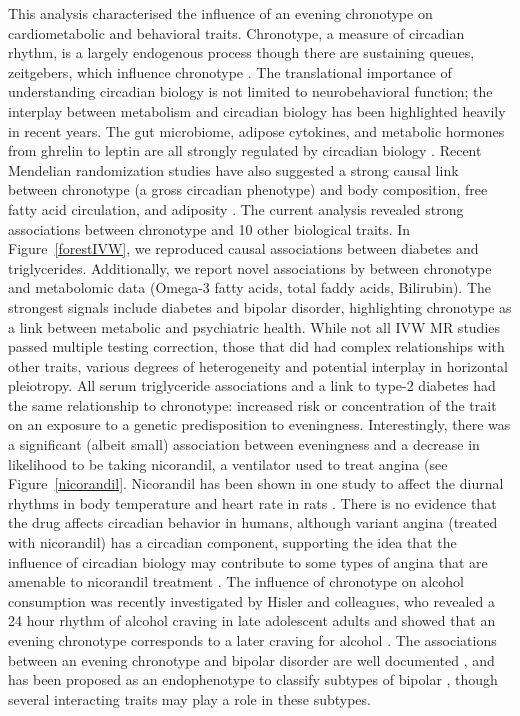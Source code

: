 \documentclass[journal,article,submit,moreauthors,pdftex]{Definitions/mdpi}
\begin{document}
This analysis characterised the influence of an evening chronotype on cardiometabolic and behavioral traits. Chronotype, a measure of circadian rhythm, is a largely endogenous process though there are sustaining queues, zeitgebers, which influence chronotype \cite{albrecht_timing_2012}. The translational importance of understanding circadian biology is not limited to neurobehavioral function; the interplay between metabolism and circadian biology has been highlighted heavily in recent years. The gut microbiome, adipose cytokines, and metabolic hormones from ghrelin to leptin are all strongly regulated by circadian biology \cite{li_circadian_2020,socaciu_melatonin_2020,pan_circadian_2020}. Recent Mendelian randomization studies have also suggested a strong causal link between chronotype (a gross circadian phenotype) and body composition, free fatty acid circulation, and adiposity \cite{adams_evaluating_2019,jones_genome-wide_2019}. The current analysis revealed strong associations between chronotype and 10 other biological traits. In Figure~\ref{forestIVW}, we reproduced causal associations between diabetes and triglycerides. Additionally, we report novel associations by between chronotype and metabolomic data (Omega-3 fatty acids, total faddy acids, Bilirubin). The strongest signals include diabetes and bipolar disorder, highlighting chronotype as a link between metabolic and psychiatric health. While not all IVW MR studies passed multiple testing correction, those that did had complex relationships with other traits, various degrees of heterogeneity and potential interplay in horizontal pleiotropy.
All serum triglyceride associations and a link to type-2 diabetes had the same relationship to chronotype: increased risk or concentration of the trait on an exposure to a genetic predisposition to eveningness. Interestingly, there was a significant (albeit small) association between eveningness and a decrease in likelihood to be taking nicorandil, a ventilator used to treat angina (see Figure~\ref{nicorandil}. Nicorandil has been shown in one study to affect the diurnal rhythms in body temperature and heart rate in rats \cite{Gantenbein}. There is no evidence that the drug affects circadian behavior in humans, although variant angina (treated with nicorandil) has a circadian component, supporting the idea that the influence of circadian biology may contribute to some types of angina that are amenable to nicorandil treatment \cite{Kusama}. The influence of chronotype on alcohol consumption was recently investigated by Hisler and colleagues, who revealed a 24 hour rhythm of alcohol craving in late adolescent adults and showed that an evening chronotype corresponds to a later craving for alcohol \cite{Hisler}. The associations between an evening chronotype and bipolar disorder are well documented \cite{Ferrer}, and has been proposed as an endophenotype to classify subtypes of bipolar \cite{romo-nava}, though several interacting traits may play a role in these subtypes.
\end{document}
